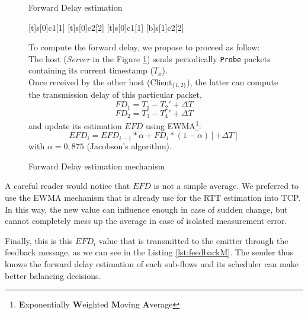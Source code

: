 \begin{figure}[!h]
\begin{minipage}[c]{.55\linewidth}
\begin{msc}[r]{Forward Delay estimation}

\setlength{\instfootheight}{0em}
\setlength{\instheadheight}{0em}
\setlength{\instdist}{0.25\linewidth}
\setlength{\levelheight}{3em}


[t]{s}[0]{c1}[1]
\nextlevel
{}[t]{s}[0]{c2}[2]
\nextlevel
{}[t]{s}[0]{c1}[1]
[b]{s}[1]{c2}[2]
\nextlevel
{}
\nextlevel
{}
\nextlevel
\end{msc}
\caption{Forward Delay estimation mechanism}
\label{fig:forwardDelayComputation}
\end{minipage}
\begin{minipage}[c]{.44\linewidth}
To compute the forward delay, we propose to proceed as follow:\\

The host (\textit{Server} in the Figure \ref{fig:forwardDelayComputation}) sends periodically \verb!Probe! packets containing its current timestamp ($T_x$).\\

Once received by the other host (Client$_{\{1,2\}}$), the latter can compute the transmission delay of this particular packet,
$$FD_1 = T_1 - T_2' + \Delta{}T$$
$$FD_2 = T_3 - T_4' + \Delta{}T$$
and update its estimation $EFD$ using EWMA\footnote{\textbf{E}xponentially \textbf{W}eighted \textbf{M}oving \textbf{A}verage}:
$$EFD_{i} = EFD_{i-1}*\alpha + FD_i*(1-\alpha) [+ \Delta T]$$
with $\alpha = 0,875$ (Jacobson's algorithm).
\end{minipage}
\end{figure}

\newpage
A careful reader would notice that $EFD$ is not a simple average. We preferred to use the EWMA mechanism that is already use for the RTT estimation into TCP. In this way, the new value can influence enough in case of sudden change, but cannot completely mess up the average in case of isolated measurement error.

Finally, this is this $EFD_{i}$ value that is transmitted to the emitter through the feedback message, as we can see in the Listing \ref{lst:feedbackM}. The sender thus knows the forward delay estimation of each sub-flows and its scheduler can make better balancing decisions.

